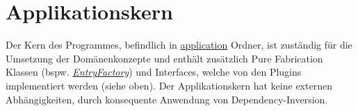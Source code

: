 \section{Applikationskern}

Der Kern des Programmes, befindlich in \href{https://github.com/moorts/Morik/tree/main/src/application}{application} Ordner, ist zuständig für die Umsetzung der Domänenkonzepte und enthält zusätzlich Pure Fabrication Klassen (bspw. \href{https://github.com/moorts/Morik/blob/main/src/application/EntryFactory.h}{\textit{EntryFactory}}) und Interfaces, welche von den Plugins implementiert werden (siehe oben). Der Applikationskern hat keine externen Abhängigkeiten, durch konsequente Anwendung von Dependency-Inversion. 
